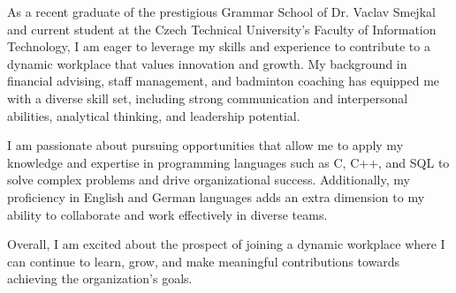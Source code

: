 \documentclass[9pt]{developercv} %
\begin{document}
\vspace{0.5cm}



\begin{minipage}[t]{0.6\textwidth} %
	\vspace{-\baselineskip} %
	
	As a recent graduate of the prestigious Grammar School of Dr. Vaclav Smejkal and current student at the Czech Technical University's Faculty of Information Technology, I am eager to leverage my skills and experience to contribute to a dynamic workplace that values innovation and growth. My background in financial advising, staff management, and badminton coaching has equipped me with a diverse skill set, including strong communication and interpersonal abilities, analytical thinking, and leadership potential.

	I am passionate about pursuing opportunities that allow me to apply my knowledge and expertise in programming languages such as C, C++, and SQL to solve complex problems and drive organizational success. Additionally, my proficiency in English and German languages adds an extra dimension to my ability to collaborate and work effectively in diverse teams.

	Overall, I am excited about the prospect of joining a dynamic workplace where I can continue to learn, grow, and make meaningful contributions towards achieving the organization's goals.\\
\end{minipage}
\hfill %
\begin{minipage}[t]{0.4\textwidth} %
	\vspace{1cm}
	\vspace{-\baselineskip} %
	\begin{barchart}{5.5}
	\end{barchart}
\end{minipage}
\end{document}
